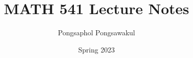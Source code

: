 \documentclass[11pt,titlepage=false]{scrreprt}
\begin{document}
\setlength{\textheight}{8.5in}
\setlength{\parskip}{2ex plus 0.5ex minus 0.2ex}
\setlength{\parindent}{0pt}


\title{MATH 541 Lecture Notes}
\author{Pongsaphol Pongsawakul}
\date{Spring 2023}
\maketitle
\tableofcontents


% 
% 





% 
% 
% 

% 
% 
\end{document}
